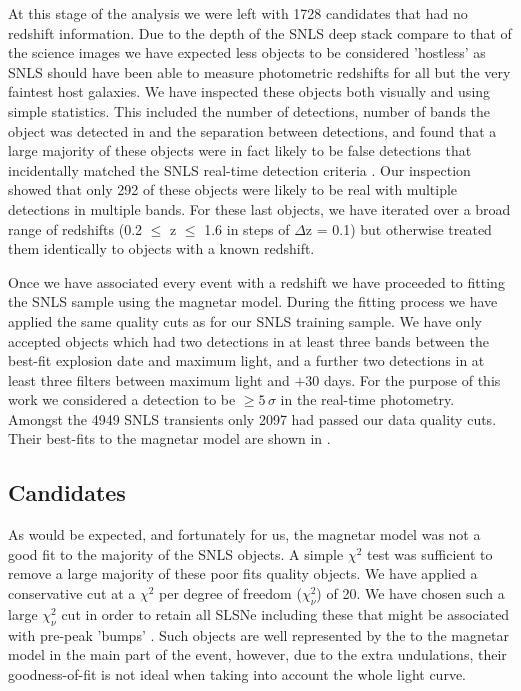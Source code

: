At this stage of the analysis we were left with 1728 candidates that had no redshift information. Due to the depth of the SNLS deep stack compare to that of the science images we have expected less objects to be considered 'hostless' as SNLS should have been able to measure photometric redshifts for all but the very faintest host galaxies. We have inspected these objects both visually and using simple statistics. This included the number of detections, number of bands the object was detected in and the separation between detections, and found that a large majority of these objects were in fact likely to be false detections that incidentally matched the SNLS real-time detection criteria \citep{Perrett2010}. Our inspection showed that only 292 of these objects were likely to be real with multiple detections in multiple bands. For these last objects, we have iterated over a broad range of redshifts (0.2 $\leq$ z $\leq$ 1.6 in steps of $\Delta$z = 0.1) but otherwise treated them identically to objects with a known redshift.

Once we have associated every event with a redshift we have proceeded to fitting the SNLS sample using the magnetar model. During the fitting process we have applied the same quality cuts as for our SNLS training sample. We have only accepted objects which had two detections in at least three bands between the best-fit explosion date and maximum light, and a further two detections in at least three filters between maximum light and $+30$ days. For the purpose of this work we considered a detection to be $\geq5$\,$\sigma$ in the real-time photometry. Amongst the 4949 SNLS transients only 2097 had passed our data quality cuts. Their best-fits to the magnetar model are shown in .

\subsection{Candidates}
\label{sec:SLSNCands}
As would be expected, and fortunately for us, the magnetar model was not a good fit to the majority of the SNLS objects. A simple $\chi^2$ test was sufficient to remove a large majority of these poor fits quality objects. We have applied a conservative cut at a $\chi^2$ per degree of freedom ($\chi^2_{\nu}$) of 20. We have chosen such a large $\chi^2_{\nu}$ cut in order to retain all SLSNe including these that might be associated with pre-peak 'bumps' \citep{2015ApJ...807L..18N,2015arXiv151103740N,2016ApJ...818L...8S}. Such objects are well represented by the to the magnetar model in the main part of the event, however, due to the extra undulations, their goodness-of-fit is not ideal when taking into account the whole light curve.

